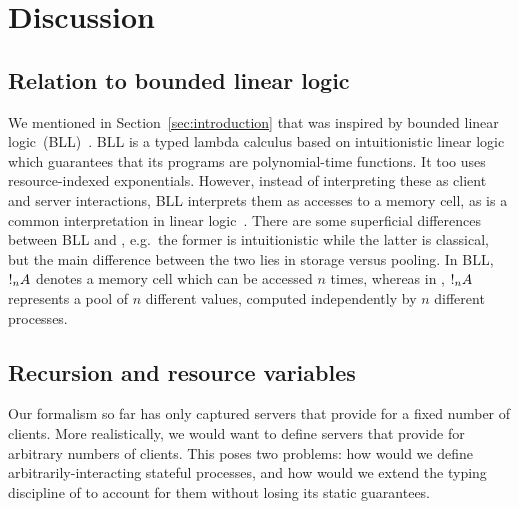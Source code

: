 \chapter{Discussion}\label{sec:discussion}


\section{Relation to bounded linear logic}
We mentioned in Section~\ref{sec:introduction} that \nodcap was inspired by
bounded linear logic~(BLL)~\cite{girard1992}. BLL is a typed lambda calculus
based on intuitionistic linear logic which guarantees that its programs are
polynomial-time functions.
It too uses resource-indexed exponentials. However, instead of interpreting
these as client and server interactions, BLL interprets them as accesses to a
memory cell, as is a common interpretation in linear logic~\cite{girard1987}.
There are some superficial differences between BLL and \nodcap, e.g.\ the former
is intuitionistic while the latter is classical, but the main difference between
the two lies in storage versus pooling. In BLL, $\take[n]{A}$ denotes a memory
cell which can be accessed $n$ times, whereas in \nodcap, $\take[n]{A}$
represents a pool of $n$ different values, computed independently by $n$
different processes.

\section{Recursion and resource variables}
Our formalism so far has only captured servers that provide for a fixed number
of clients.  More realistically, we would want to define servers that provide
for arbitrary numbers of clients.  This poses two problems: how would we define
arbitrarily-interacting stateful processes, and how would we extend the
typing discipline of \nodcap to account for them without losing its static
guarantees.

